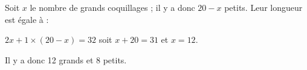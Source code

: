 
\bigskip

% 
%
% 
Soit $x$ le nombre de grands coquillages ; il y a donc $20 - x$ petits. Leur longueur est égale à :

$2x + 1\times (20 - x) = 32$ soit $x + 20 = 31$ et $x = 12$.

Il y a donc 12 grands et 8 petits.
\bigskip 

